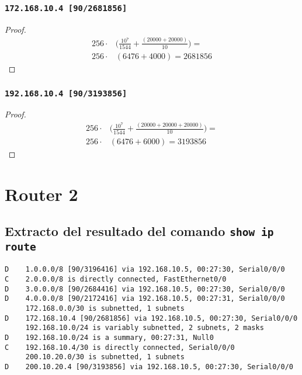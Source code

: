\documentclass[12pt, times]{simauth}
\begin{document}
\begin{minipage}[t]{0.45\linewidth}  
\subsubsection{\texttt{172.168.10.4 [90/2681856]}}
\begin{proof}
    \begin{align*}
        256 \cdot & \bigg(\frac{10^7}{1544} + \frac{(20000 + 20000)}{10}\bigg) = \\
        256 \cdot & (6476 + 4000) = 2681856
    \end{align*}
\end{proof}
\subsubsection{\texttt{192.168.10.4 [90/3193856]}}
\begin{proof}
    \begin{align*}
        256 \cdot & \bigg(\frac{10^7}{1544} + \frac{(20000 + 20000 + 20000)}{10}\bigg) = \\
        256 \cdot & (6476 + 6000) = 3193856
    \end{align*}
\end{proof}
\end{minipage}


\section{Router 2}
\subsection{Extracto del resultado del comando \texttt{show ip route}}

\begin{verbatim}
D    1.0.0.0/8 [90/3196416] via 192.168.10.5, 00:27:30, Serial0/0/0
C    2.0.0.0/8 is directly connected, FastEthernet0/0
D    3.0.0.0/8 [90/2684416] via 192.168.10.5, 00:27:30, Serial0/0/0
D    4.0.0.0/8 [90/2172416] via 192.168.10.5, 00:27:31, Serial0/0/0
     172.168.0.0/30 is subnetted, 1 subnets
D    172.168.10.4 [90/2681856] via 192.168.10.5, 00:27:30, Serial0/0/0
     192.168.10.0/24 is variably subnetted, 2 subnets, 2 masks
D    192.168.10.0/24 is a summary, 00:27:31, Null0
C    192.168.10.4/30 is directly connected, Serial0/0/0
     200.10.20.0/30 is subnetted, 1 subnets
D    200.10.20.4 [90/3193856] via 192.168.10.5, 00:27:30, Serial0/0/0
\end{verbatim}
\end{document}
